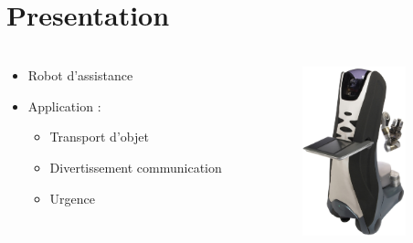 \section{Presentation}
\begin{frame}
	\frametitle{}
	\begin{columns}[T]
		\begin{column}{.5\textwidth}
			\begin{itemize}
			\item Robot d'assistance
			\item Application :
				\begin{itemize}
				\item Transport d'objet
				\item Divertissement communication
				\item Urgence
				\end{itemize}
			\end{itemize}
		\end{column}
   		\begin{column}{.5\textwidth}
			\includegraphics[width=3cm]{./image/Care_o_bot_3.jpg}
   		\end{column}
	\end{columns}
\end{frame}


